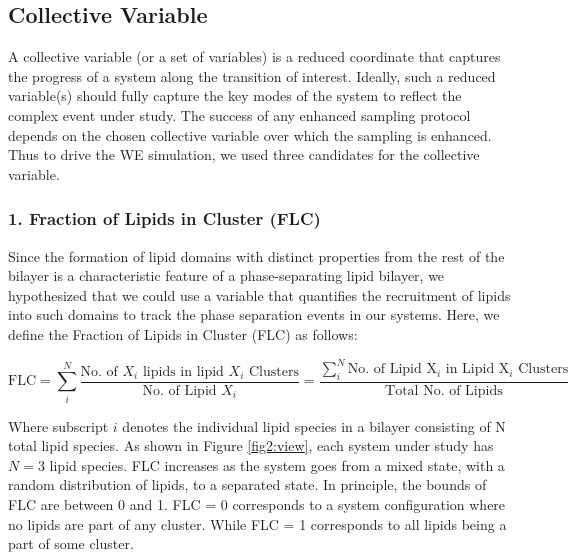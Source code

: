 \documentclass{biophys-new}
\begin{document}
\subsection*{Collective Variable}

A collective variable (or a set of variables) is a reduced coordinate that captures the progress of a system along the transition of interest.
Ideally, such a reduced variable(s) should fully capture the key modes of the system to reflect the complex event under study.
The success of any enhanced sampling protocol depends on the chosen collective variable over which the sampling is enhanced\cite{Valsson2016, Yang2019b, Henin2022}. 
Thus to drive the WE simulation, we used three candidates for the collective variable.

\subsubsection*{1. Fraction of Lipids in Cluster (FLC)}
Since the formation of lipid domains with distinct properties from the rest of the bilayer is a characteristic feature of a phase-separating lipid bilayer,
we hypothesized that we could use a variable that quantifies the recruitment of lipids into such domains to track the phase separation events in our systems.
Here, we define the Fraction of Lipids in Cluster (FLC) as follows:

\begin{equation}
\label{eq:CLT}
\text{FLC} = \sum_{i}^{N} \frac{\text{No. of $X_i$ lipids in lipid $X_i$ Clusters}}{\text{No. of Lipid $X_i$}} =  \frac{\sum_{i}^{N} \text{No. of Lipid X$_i$ in Lipid X$_i$ Clusters}}{\text{Total No. of Lipids}}
\end{equation}

Where subscript $i$ denotes the individual lipid species in a bilayer consisting of N total lipid species.
As shown in Figure \ref{fig2:view}, each system under study has $N=3$ lipid species.
FLC increases as the system goes from a mixed state, with a random distribution of lipids, to a separated state.
In principle, the bounds of FLC are between 0 and 1.
FLC = 0 corresponds to a system configuration where no lipids are part of any cluster.
While FLC = 1 corresponds to all lipids being a part of some cluster. 
\end{document}
